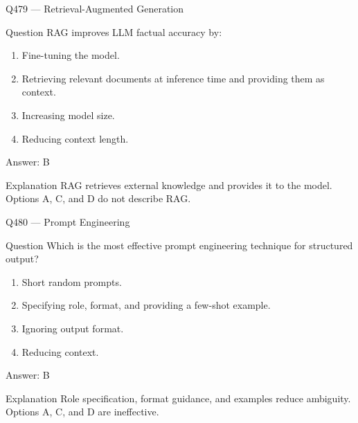 \documentclass[aspectratio=169,8pt]{beamer}
\begin{document}
	\begin{frame}{Q479 --- Retrieval-Augmented Generation}
		\begin{block}{Question}
			RAG improves LLM factual accuracy by:
			\begin{enumerate}
				\item Fine-tuning the model.
				\item Retrieving relevant documents at inference time and providing them as context.
				\item Increasing model size.
				\item Reducing context length.
			\end{enumerate}
		\end{block}
		\begin{exampleblock}{Answer: B}\end{exampleblock}
		\begin{block}{Explanation}
			RAG retrieves external knowledge and provides it to the model. Options A, C, and D do not describe RAG.
		\end{block}
	\end{frame}
	
	\begin{frame}{Q480 --- Prompt Engineering}
		\begin{block}{Question}
			Which is the most effective prompt engineering technique for structured output?
			\begin{enumerate}
				\item Short random prompts.
				\item Specifying role, format, and providing a few-shot example.
				\item Ignoring output format.
				\item Reducing context.
			\end{enumerate}
		\end{block}
		\begin{exampleblock}{Answer: B}\end{exampleblock}
		\begin{block}{Explanation}
			Role specification, format guidance, and examples reduce ambiguity. Options A, C, and D are ineffective.
		\end{block}
	\end{frame}
	
\end{document}
